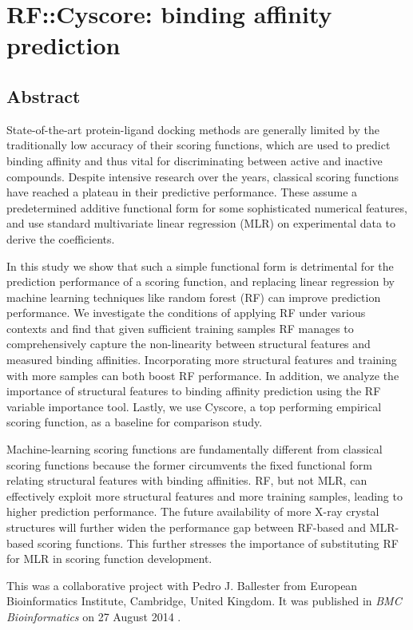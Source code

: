 \chapter{RF::Cyscore: binding affinity prediction}

\section{Abstract}

State-of-the-art protein-ligand docking methods are generally limited by the traditionally low accuracy of their scoring functions, which are used to predict binding affinity and thus vital for discriminating between active and inactive compounds. Despite intensive research over the years, classical scoring functions have reached a plateau in their predictive performance. These assume a predetermined additive functional form for some sophisticated numerical features, and use standard multivariate linear regression (MLR) on experimental data to derive the coefficients.

In this study we show that such a simple functional form is detrimental for the prediction performance of a scoring function, and replacing linear regression by machine learning techniques like random forest (RF) can improve prediction performance. We investigate the conditions of applying RF under various contexts and find that given sufficient training samples RF manages to comprehensively capture the non-linearity between structural features and measured binding affinities. Incorporating more structural features and training with more samples can both boost RF performance. In addition, we analyze the importance of structural features to binding affinity prediction using the RF variable importance tool. Lastly, we use Cyscore, a top performing empirical scoring function, as a baseline for comparison study.

Machine-learning scoring functions are fundamentally different from classical scoring functions because the former circumvents the fixed functional form relating structural features with binding affinities. RF, but not MLR, can effectively exploit more structural features and more training samples, leading to higher prediction performance. The future availability of more X-ray crystal structures will further widen the performance gap between RF-based and MLR-based scoring functions. This further stresses the importance of substituting RF for MLR in scoring function development.

This was a collaborative project with Pedro J. Ballester from European Bioinformatics Institute, Cambridge, United Kingdom. It was published in \textit{BMC Bioinformatics} on 27 August 2014 \citep{1432}.

